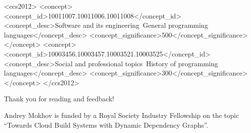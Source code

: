 \documentclass[acmsmall,review]{acmart}\settopmatter{printfolios=true,printccs=false,printacmref=false}
\begin{document}
\begin{CCSXML}
<ccs2012>
<concept>
<concept_id>10011007.10011006.10011008</concept_id>
<concept_desc>Software and its engineering~General programming languages</concept_desc>
<concept_significance>500</concept_significance>
</concept>
<concept>
<concept_id>10003456.10003457.10003521.10003525</concept_id>
<concept_desc>Social and professional topics~History of programming languages</concept_desc>
<concept_significance>300</concept_significance>
</concept>
</ccs2012>
\end{CCSXML}


\maketitle










\begin{acks}
  Thank you for reading and feedback!

  Andrey Mokhov is funded by a Royal Society Industry Fellowship on the topic
  ``Towards Cloud Build Systems with Dynamic Dependency Graphs''.
\end{acks}



% 
\end{document}

